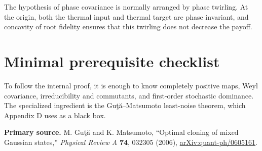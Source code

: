 \documentclass[11pt]{article}
\begin{document}
The hypothesis of phase covariance is normally arranged by phase twirling.
At the origin, both the thermal input and thermal target are phase invariant,
and concavity of root fidelity ensures that this twirling does not decrease
the payoff.

\section{Minimal prerequisite checklist}

To follow the internal proof, it is enough to know completely positive maps,
Weyl covariance, irreducibility and commutants, and first-order stochastic
dominance.  The specialized ingredient is the Gu\c{t}\u{a}--Matsumoto
least-noise theorem, which Appendix D uses as a black box.

\medskip
\noindent
\textbf{Primary source.}
M. Gu\c{t}\u{a} and K. Matsumoto,
``Optimal cloning of mixed Gaussian states,''
\emph{Physical Review A} \textbf{74}, 032305 (2006),
\href{https://arxiv.org/abs/quant-ph/0605161}{arXiv:quant-ph/0605161}.
\end{document}
